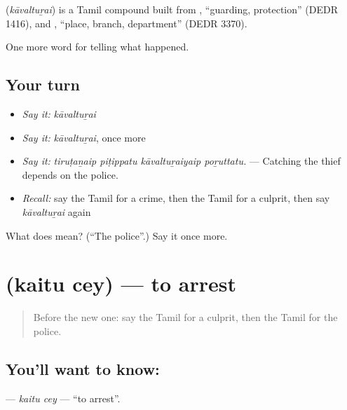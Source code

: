 \begin{cousinweb}
\textbf{} (\emph{kāvaltuṟai}) is a Tamil compound built from , \textquotedblleft{}guarding, protection\textquotedblright{} (DEDR 1416), and , \textquotedblleft{}place, branch, department\textquotedblright{} (DEDR 3370).
\end{cousinweb}

\begin{grammarlens}[title={What you've built}]
One more word for telling what happened.
\end{grammarlens}

\subsection*{Your turn}
\begin{itemize}
\raggedright
  \item \emph{Say it:} \emph{kāvaltuṟai}
  \item \emph{Say it:} \emph{kāvaltuṟai}, once more
  \item \emph{Say it:} \emph{tiruṭaṉaip piṭippatu kāvaltuṟaiyaip poṟuttatu.} — Catching the thief depends on the police.
  \item \emph{Recall:} say the Tamil for a crime, then the Tamil for a culprit, then say \emph{kāvaltuṟai} again
\end{itemize}

\begin{tcolorbox}[breakable,colback=teal!4,colframe=teal!35!black,title={Before you move on}]
What does  mean? (\textquotedblleft{}The police\textquotedblright{}.) Say it once more.
\end{tcolorbox}
\section[\texorpdfstring{\ta{கைது} \ta{செய்} (kaitu cey)}{கைது செய் (kaitu cey)}]{  (kaitu cey) — to arrest}

\label{lesson:TA-C296-kaitu-cey}



\begin{quote}
Before the new one: say the Tamil for a culprit, then the Tamil for the police.
\end{quote}

\subsection*{You'll want to know:  }
\textbf{ } — \emph{kaitu cey} — \textquotedblleft{}to arrest\textquotedblright{}.

